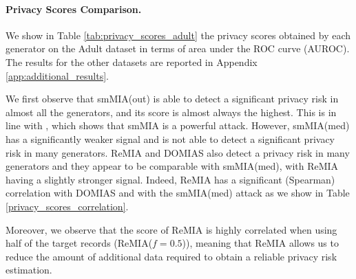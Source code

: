 \paragraph{Privacy Scores Comparison.}
We show in Table \ref{tab:privacy_scores_adult} the privacy scores obtained by each generator on the Adult dataset in terms of area under the ROC curve (AUROC).
The results for the other datasets are reported in Appendix \ref{app:additional_results}.
\begin{table}[t]
  \caption{Privacy scores (AUROC) for Adult dataset (\%). We show the mean and standard deviation of the scores across all repetitions. When the relative accuracy is significantly higher than 50\% according to a one-sided binomial test with $p<0.001$ the scores are underlined (we aggregate counts over all repetitions). Because of the computational cost, only one repetition was performed for \textit{Aindo}.}
  \label{tab:privacy_scores_adult}
  \centering
  
\end{table}
We first observe that smMIA(out) is able to detect a significant privacy risk in almost all the generators, and its score is almost always the highest. This is in line with \citet{meeus2023achilles}, which shows that smMIA is a powerful attack. However, smMIA(med) has a significantly weaker signal and is not able to detect a significant privacy risk in many generators.
ReMIA and DOMIAS also detect a privacy risk in many generators and they appear to be comparable with smMIA(med), with ReMIA having a slightly stronger signal.
Indeed, ReMIA has a significant (Spearman) correlation with DOMIAS and with the smMIA(med) attack as we show in Table \ref{privacy_scores_correlation}.
\begin{table}[t]
  \caption{Spearman correlation between the scores of the different metrics across datasets and SDGs. The correlation is computed on the mean scores across all repetitions, stars indicate statistical significance (**: $p<0.01$, ***: $p<0.001$). Scores inferior to 50\% are clipped to 50\% before computing the correlation.}
  \label{privacy_scores_correlation}
  \centering
  
\end{table}
Moreover, we observe that the score of ReMIA is highly correlated when using half of the target records (ReMIA($f=0.5$)), meaning that ReMIA allows us to reduce the amount of additional data required to obtain a reliable privacy risk estimation.

